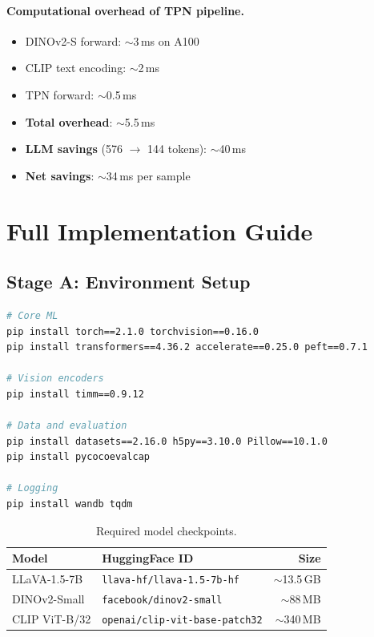 \documentclass[11pt,a4paper]{article}
\begin{document}
\paragraph{Computational overhead of TPN pipeline.}
\begin{itemize}[leftmargin=1.5em, itemsep=1pt]
  \item DINOv2-S forward: $\sim$3\,ms on A100
  \item CLIP text encoding: $\sim$2\,ms
  \item TPN forward: $\sim$0.5\,ms
  \item \textbf{Total overhead}: $\sim$5.5\,ms
  \item \textbf{LLM savings} (576 $\to$ 144 tokens): $\sim$40\,ms
  \item \textbf{Net savings}: $\sim$34\,ms per sample
\end{itemize}

\section{Full Implementation Guide}
\label{sec:implementation}

\subsection{Stage A: Environment Setup}

\begin{implbox}[title={Required Libraries}]
\begin{lstlisting}[numbers=none, language=bash]
# Core ML
pip install torch==2.1.0 torchvision==0.16.0
pip install transformers==4.36.2 accelerate==0.25.0 peft==0.7.1

# Vision encoders
pip install timm==0.9.12

# Data and evaluation
pip install datasets==2.16.0 h5py==3.10.0 Pillow==10.1.0
pip install pycocoevalcap

# Logging
pip install wandb tqdm
\end{lstlisting}
\end{implbox}

\begin{table}[h]
\centering
\caption{Required model checkpoints.}
\label{tab:checkpoints}
\renewcommand{\arraystretch}{1.15}
\small
\begin{tabular}{@{}llr@{}}
  \toprule
  Model & HuggingFace ID & Size \\
  \midrule
  LLaVA-1.5-7B & \texttt{llava-hf/llava-1.5-7b-hf} & $\sim$13.5\,GB \\
  DINOv2-Small & \texttt{facebook/dinov2-small} & $\sim$88\,MB \\
  CLIP ViT-B/32 & \texttt{openai/clip-vit-base-patch32} & $\sim$340\,MB \\
  \bottomrule
\end{tabular}
\end{table}
\end{document}

